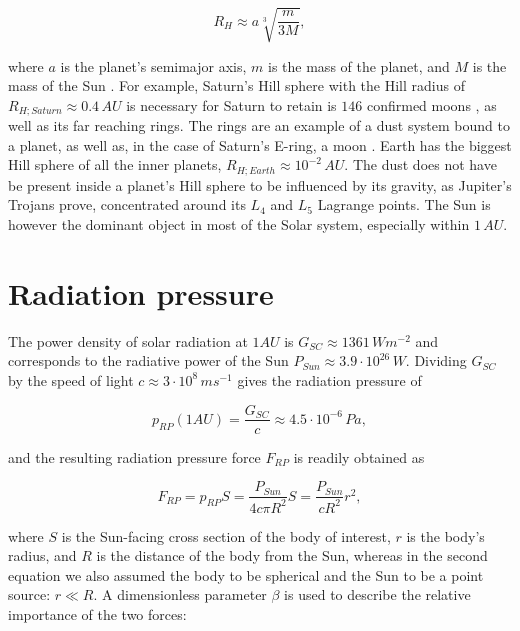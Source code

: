 \begin{equation}
    R_H \approx a \sqrt[3]{\frac{m}{3M}},
\end{equation}

where $a$ is the planet's semimajor axis, $m$ is the mass of the planet, and $M$ is the mass of the Sun \cite{sheppard2023new}. For example, Saturn's Hill sphere with the Hill radius of $R_{H;Saturn} \approx 0.4 \, \si{AU}$ is necessary for Saturn to retain is $146$ confirmed moons \citep{sheppard2023new}, as well as its far reaching rings. The rings are an example of a dust system bound to a planet, as well as, in the case of Saturn's E-ring, a moon \citep{kempf2010enceladus}. Earth has the biggest Hill sphere of all the inner planets, $R_{H;Earth} \approx 10^{-2} \, \si{AU}$. The dust does not have be present inside a planet's Hill sphere to be influenced by its gravity, as Jupiter's Trojans prove, concentrated around its $L_4$ and $L_5$ Lagrange points. The Sun is however the dominant object in most of the Solar system, especially within $1 \, \si{AU}$.

\section{Radiation pressure}

The power density of solar radiation at $1 \si{AU}$ is $G_{SC} \approx 1361 \, \si{W m^{-2}}$ \citep{kopp2011new} and corresponds to the radiative power of the Sun $P_{Sun} \approx 3.9 \cdot 10^{26} \, \si{W}$. Dividing $G_{SC}$ by the speed of light $c \approx 3\cdot10^8 \, \si{m s^{-1}}$ gives the radiation pressure of

\begin{equation}
    p_{RP}(1 \si{AU}) = \frac{G_{SC}}{c} \approx 4.5 \cdot 10^{-6} \, \si{Pa},
\end{equation}

and the resulting radiation pressure force $F_{RP}$ is readily obtained as

\begin{equation}
    F_{RP} = p_{RP} S = \frac{P_{Sun}}{4 c \pi R^2} S = \frac{P_{Sun}}{cR^2} r^2, \label{eq:radiation_pressure_force}
\end{equation}

where $S$ is the Sun-facing cross section of the body of interest, $r$ is the body's radius, and $R$ is the distance of the body from the Sun, whereas in the second equation we also assumed the body to be spherical and the Sun to be a point source: $r \ll R$. A dimensionless parameter $\beta$ is used to describe the relative importance of the two forces:

